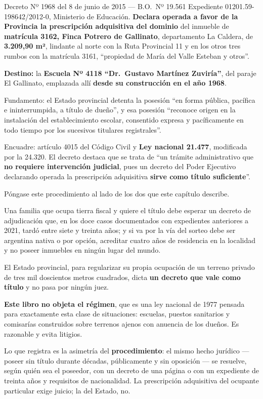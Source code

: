\begin{ficha}{Decreto Nº 1968 del 8 de junio de 2015 --- B.O.\ Nº 19.561}
Expediente 01201.59-198642/2012-0, Ministerio de Educación. \textbf{Declara operada a favor de la Provincia la prescripción adquisitiva del dominio} del inmueble de \textbf{matrícula 3162, Finca Potrero de Gallinato}, departamento La Caldera, de \textbf{3.209,90 m²}, lindante al norte con la Ruta Provincial 11 y en los otros tres rumbos con la matrícula 3161, ``propiedad de María del Valle Esteban y otros''.

\textbf{Destino:} la \textbf{Escuela Nº 4118 ``Dr.\ Gustavo Martínez Zuviría''}, del paraje El Gallinato, emplazada allí \textbf{desde su construcción en el año 1968}.

Fundamento: el Estado provincial detenta la posesión ``en forma pública, pacífica e ininterrumpida, a título de dueño'', y esa posesión ``reconoce origen en la instalación del establecimiento escolar, consentido expresa y pacíficamente en todo tiempo por los sucesivos titulares registrales''.

Encuadre: artículo 4015 del Código Civil y \textbf{Ley nacional 21.477}, modificada por la 24.320. El decreto destaca que se trata de ``un trámite administrativo que \textbf{no requiere intervención judicial}, pues un decreto del Poder Ejecutivo declarando operada la prescripción adquisitiva \textbf{sirve como título suficiente}''.
\end{ficha}

\begin{cautela}
Póngase este procedimiento al lado de los dos que este capítulo describe.

Una familia que ocupa tierra fiscal y quiere el título debe esperar un decreto de adjudicación que, en los doce casos documentados con expedientes anteriores a 2021, tardó entre siete y treinta años; y si va por la vía del sorteo debe ser argentina nativa o por opción, acreditar cuatro años de residencia en la localidad y no poseer inmuebles en ningún lugar del mundo.

El Estado provincial, para regularizar su propia ocupación de un terreno privado de tres mil doscientos metros cuadrados, dicta \textbf{un decreto que vale como título} y no pasa por ningún juez.

\textbf{Este libro no objeta el régimen}, que es una ley nacional de 1977 pensada para exactamente esta clase de situaciones: escuelas, puestos sanitarios y comisarías construidos sobre terrenos ajenos con anuencia de los dueños. Es razonable y evita litigios.

Lo que registra es la asimetría del \textbf{procedimiento}: el mismo hecho jurídico --- poseer sin título durante décadas, públicamente y sin oposición --- se resuelve, según quién sea el poseedor, con un decreto de una página o con un expediente de treinta años y requisitos de nacionalidad. La prescripción adquisitiva del ocupante particular exige juicio; la del Estado, no.
\end{cautela}

